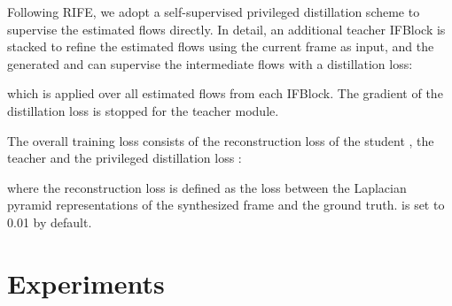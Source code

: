 \documentclass[sigconf]{acmart}
\begin{document}
Following RIFE, we adopt a self-supervised privileged distillation scheme to supervise the estimated flows directly. In detail, an additional teacher IFBlock is stacked to refine the estimated flows using the current frame  as input, and the generated  and  can supervise the intermediate flows with a distillation loss:

which is applied over all estimated flows from each IFBlock. The gradient of the distillation loss is stopped for the teacher module.

The overall training loss consists of the reconstruction loss of the student , the teacher  and the privileged distillation loss :

where the reconstruction loss is defined as the  loss between the Laplacian pyramid representations of the synthesized frame and the ground truth.  is set to 0.01 by default.


\section{Experiments}
\label{sec:exps}
\end{document}
